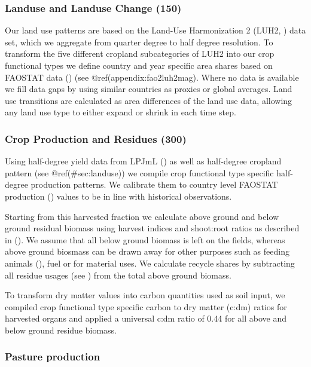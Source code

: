 \documentclass[gc, manuscript]{copernicus}
\begin{document}
\hypertarget{sec:landuse}{%
\subsubsection{Landuse and Landuse Change (150)}\label{sec:landuse}}

Our land use patterns are based on the Land-Use Harmonization 2 (LUH2,
\citep{LUH2}) data set, which we aggregate from quarter degree to half
degree resolution. To transform the five different cropland
subcategories of LUH2 into our crop functional types we define country
and year specific area shares based on FAOSTAT data (\citep{FAOSTAT})
(see @ref(appendix:fao2luh2mag). Where no data is available we fill data
gaps by using similar countries as proxies or global averages. Land use
transitions are calculated as area differences of the land use data,
allowing any land use type to either expand or shrink in each time step.

\subsubsection{Crop Production and Residues (300)}

Using half-degree yield data from LPJmL (\citep{LPJmL4_1}) as well as
half-degree cropland pattern (see @ref(\#sec:landuse)) we compile crop
functional type specific half-degree production patterns. We calibrate
them to country level FAOSTAT production (\citep{FAOSTAT}) values to be
in line with historical observations.

Starting from this harvested fraction we calculate above ground and
below ground residual biomass using harvest indices and shoot:root
ratios as described in (\citep{bodirsky2012}). We assume that all below
ground biomass is left on the fields, whereas above ground biosmass can
be drawn away for other purposes such as feeding animals
(\citep{weindl}), fuel or for material uses. We calculate recycle shares
by subtracting all residue usages (see \citep{bodirsky1012}) from the
total above ground biomass.

To transform dry matter values into carbon quantities used as soil
input, we compiled crop functional type specific carbon to dry matter
(c:dm) ratios for harvested organs and applied a universal c:dm ratio of
0.44 for all above and below ground residue biomass.

\subsubsection{Pasture production}
\end{document}
